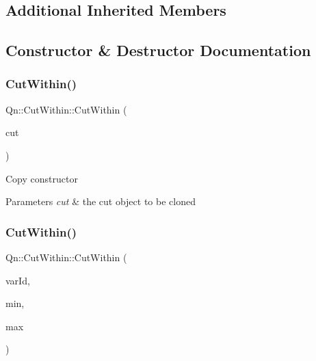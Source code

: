 \subsection*{Additional Inherited Members}


\subsection{Constructor \& Destructor Documentation}
\mbox{\label{classQn_1_1CutWithin_a49442a5fdc7b6bfce9818c2c99b859ce}} 
\subsubsection{\texorpdfstring{Cut\+Within()}{CutWithin()}\hspace{0.1cm}{\footnotesize\ttfamily [1/2]}}
{\footnotesize\ttfamily Qn\+::\+Cut\+Within\+::\+Cut\+Within (\begin{DoxyParamCaption}\item[{const \mbox{\hyperlink{classQn_1_1CutWithin}{Cut\+Within}} \&}]{cut }\end{DoxyParamCaption})}

Copy constructor 
\begin{DoxyParams}{Parameters}
{\em cut} & the cut object to be cloned \\
\hline
\end{DoxyParams}
\mbox{\label{classQn_1_1CutWithin_a8f151a39deb135d441907394c9a9ad17}} 
\subsubsection{\texorpdfstring{Cut\+Within()}{CutWithin()}\hspace{0.1cm}{\footnotesize\ttfamily [2/2]}}
{\footnotesize\ttfamily Qn\+::\+Cut\+Within\+::\+Cut\+Within (\begin{DoxyParamCaption}\item[{Int\+\_\+t}]{var\+Id,  }\item[{Float\+\_\+t}]{min,  }\item[{Float\+\_\+t}]{max }\end{DoxyParamCaption})}

